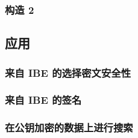 \subsubsection{构造 2}\label{subsubsec:15-6-3-4}

\begin{theorem}\label{theo:15-7}
	
\end{theorem}

\subsection{应用}\label{subsec:15-6-4}

\subsubsection{来自 IBE 的选择密文安全性}\label{subsubsec:15-6-4-1}

\begin{theorem}\label{theo:15-8}
	
\end{theorem}

\subsubsection{来自 IBE 的签名}\label{subsubsec:15-6-4-2}

\begin{theorem}\label{theo:15-9}
	
\end{theorem}

\subsubsection{在公钥加密的数据上进行搜索}\label{subsubsec:15-6-4-3}
